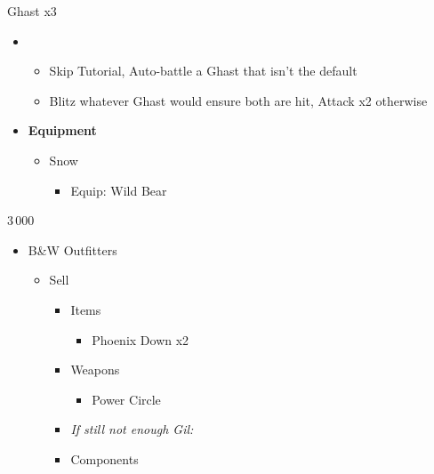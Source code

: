 \begin{paracol}{2}
\begin{battle}{Ghast x3}
\begin{itemize}
    \item \first
    \begin{itemize}
        \item Skip Tutorial, Auto-battle a Ghast that isn't the default
        \item Blitz whatever Ghast would ensure both are hit, Attack x2 otherwise
    \end{itemize}
\end{itemize}
\end{battle}
\switchcolumn*
	\begin{menu}
		\begin{itemize}
			\item \textbf{Equipment}
			      \begin{itemize}
				      \item Snow
				            \begin{itemize}
					            \item Equip: Wild Bear
				            \end{itemize}
			      \end{itemize}
		\end{itemize}
	\end{menu}
	\switchcolumn
	\switchcolumn*
	\begin{shop}{3\,000}
		\begin{itemize}
			\item B\&W Outfitters
			      \begin{itemize}
				      \item Sell
				            \begin{itemize}
					            \item Items
					                  \begin{itemize}
						                  \item Phoenix Down x2
					                  \end{itemize}
					            \item Weapons
					                  \begin{itemize}
						                  \item Power Circle
					                  \end{itemize}
					            \item \textit{If still not enough Gil:}
					            \item Components
					                  \begin{itemize}

\end{itemize}
\end{itemize}
\end{itemize}
\end{itemize}
\end{shop}
\end{paracol}
